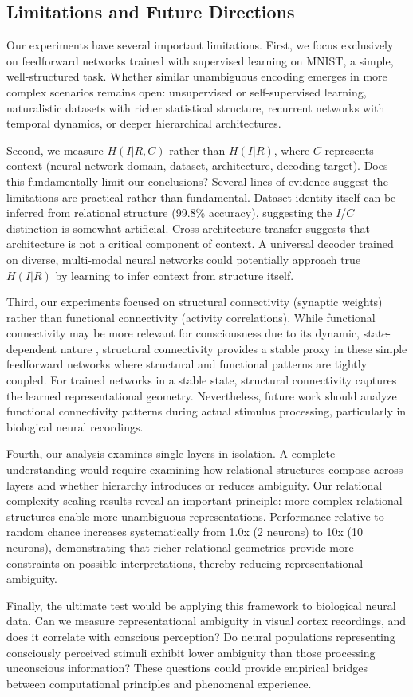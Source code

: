 \subsection{Limitations and Future Directions}

Our experiments have several important limitations. First, we focus exclusively on feedforward networks trained with supervised learning on MNIST, a simple, well-structured task. Whether similar unambiguous encoding emerges in more complex scenarios remains open: unsupervised or self-supervised learning, naturalistic datasets with richer statistical structure, recurrent networks with temporal dynamics, or deeper hierarchical architectures.

Second, we measure $H(I|R,C)$ rather than $H(I|R)$, where $C$ represents context (neural network domain, dataset, architecture, decoding target). Does this fundamentally limit our conclusions? Several lines of evidence suggest the limitations are practical rather than fundamental. Dataset identity itself can be inferred from relational structure (99.8\% accuracy), suggesting the $I$/$C$ distinction is somewhat artificial. Cross-architecture transfer suggests that architecture is not a critical component of context. A universal decoder trained on diverse, multi-modal neural networks could potentially approach true $H(I|R)$ by learning to infer context from structure itself.

Third, our experiments focused on structural connectivity (synaptic weights) rather than functional connectivity (activity correlations). While functional connectivity may be more relevant for consciousness due to its dynamic, state-dependent nature \citep{pennartz2009identification}, structural connectivity provides a stable proxy in these simple feedforward networks where structural and functional patterns are tightly coupled. For trained networks in a stable state, structural connectivity captures the learned representational geometry. Nevertheless, future work should analyze functional connectivity patterns during actual stimulus processing, particularly in biological neural recordings.

Fourth, our analysis examines single layers in isolation. A complete understanding would require examining how relational structures compose across layers and whether hierarchy introduces or reduces ambiguity. Our relational complexity scaling results reveal an important principle: more complex relational structures enable more unambiguous representations. Performance relative to random chance increases systematically from 1.0x (2 neurons) to 10x (10 neurons), demonstrating that richer relational geometries provide more constraints on possible interpretations, thereby reducing representational ambiguity.

Finally, the ultimate test would be applying this framework to biological neural data. Can we measure representational ambiguity in visual cortex recordings, and does it correlate with conscious perception? Do neural populations representing consciously perceived stimuli exhibit lower ambiguity than those processing unconscious information? These questions could provide empirical bridges between computational principles and phenomenal experience.
